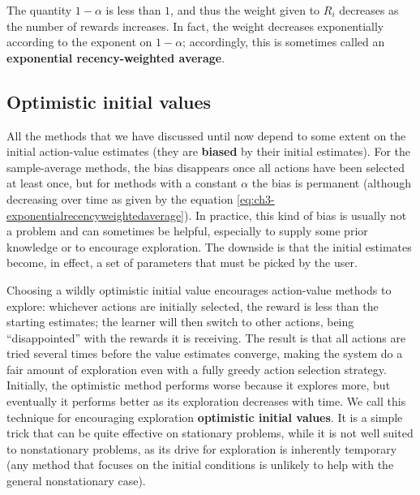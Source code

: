 The quantity $1 - \alpha$ is less than $1$, and thus the weight given to $R_i$ decreases as the number of rewards increases. In fact, the weight decreases exponentially according to the exponent on $1 - \alpha$; accordingly, this is sometimes called an \textbf{exponential recency-weighted average}.

\subsection{Optimistic initial values}
All the methods that we have discussed until now depend to some extent on the initial action-value estimates (they are \textbf{biased} by their initial estimates). For the sample-average methods, the bias disappears once all actions have been selected at least once, but for methods with a constant $\alpha$ the bias is permanent (although decreasing over time as given by the equation \eqref{eq:ch3-exponentialrecencyweightedaverage}). In practice, this kind of bias is usually not a problem and can sometimes be helpful, especially to supply some prior knowledge or to encourage exploration. The downside is that the initial estimates become, in effect, a set of parameters that must be picked by the user.

Choosing a wildly optimistic initial value encourages action-value methods to explore: whichever actions are initially selected, the reward is less than the starting estimates; the learner will then switch to other actions, being ``disappointed'' with the rewards it is receiving. The result is that all actions are tried several times before the value estimates converge, making the system do a fair amount of exploration even with a fully greedy action selection strategy. Initially, the optimistic method performs worse because it explores more, but eventually it performs better as its exploration decreases with time. We call this technique for encouraging exploration \textbf{optimistic initial values}. It is a simple trick that can be quite effective on stationary problems, while it is not well suited to nonstationary problems, as its drive for exploration is inherently temporary (any method that focuses on the initial conditions is unlikely to help with the general nonstationary case).

